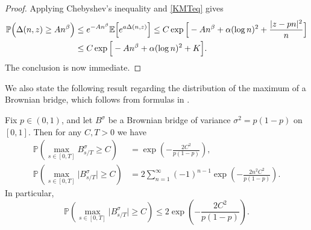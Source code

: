 \begin{proof}
	Applying Chebyshev's inequality and \eqref{KMTeq} gives
	\begin{align*}
	\mathbb{P}\Big(\Delta(n,z) \geq An^\beta\Big) &\leq e^{-An^\beta}\mathbb{E}\Big[e^{a\Delta(n,z)}\Big] \leq C\exp\Big[-An^\beta + \alpha(\log n)^2 + \frac{|z-pn|^2}{n}\Big]\\
	&\leq C\exp\Big[-An^\beta + \alpha(\log n)^2 + K\Big].
	\end{align*}
	The conclusion is now immediate.
\end{proof}

We also state the following result regarding the distribution of the maximum of a Brownian bridge, which follows from formulas in \cite[Chapter 12]{Dudley}.

\begin{lemma}\label{BBmax}
	Fix $p\in (0,1)$, and let $B^\sigma$ be a Brownian bridge of variance $\sigma^2 = p(1-p)$ on $[0,1]$. Then for any $C,T> 0$ we have
	\begin{equation}\label{BBmaxeq}
	\begin{split}
	\mathbb{P}\left(\max_{s\in[0,T]} B^\sigma_{s/T} \geq C\right) &= \exp\left( - \frac{2C^2}{p(1-p)}\right), \\ \mathbb{P}\left(\max_{s\in[0,T]} \big| B^\sigma_{s/T} \big| \geq C\right) &= 2\sum_{n=1}^\infty (-1)^{n-1} \exp\left(-\frac{2n^2C^2}{p(1-p)}\right).
	\end{split}
	\end{equation}
	In particular,
	\begin{equation}\label{sepBd}
	\mathbb{P}\left(\max_{s\in[0,T]} \big|B^\sigma_{s/T}\big| \geq C\right) \leq 2\exp\left( - \frac{2C^2}{p(1-p)}\right).
	\end{equation}
\end{lemma}

